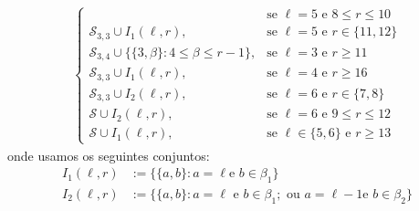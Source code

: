 \documentclass[12pt,a4paper]{book}
\begin{document}
\begin{equation*}
\begin{aligned}
\begin{cases}
        & \text{se } \ell=5 \text{ e } 8\leq r\leq 10    \\
         \mathcal{S}_{3,3} \cup I_1(\ell,r), 
        & \text{se } \ell=5 \text{ e } r\in \{11,12\}    \\
        \mathcal{S}_{3,4} \cup \{\{3,\beta\}: 4 \leq \beta \leq r-1\}, & \text{se } \ell =3 \text{ e } r \geq 11 \\
        \mathcal{S}_{3,3} \cup I_1(\ell,r),  & \text{se } \ell =4 \text{ e } r \geq 16  \\
         \mathcal{S}_{3,3} \cup I_2(\ell,r),  & \text{se } \ell=6 \text{ e } r \in\{7,8\}  \\
        \mathcal{S} \cup I_2(\ell,r),  & \text{se } \ell=6 \text{ e }  9\leq r \leq 12 \\
        \mathcal{S} \cup I_1(\ell,r),  & \text{se } \ell \in\{5,6\} \text{ e } r \geq 13         
        \end{cases}
    \end{aligned}  
\end{equation*}
onde usamos os seguintes conjuntos:
\begin{equation*}
    \begin{aligned}
        I_1(\ell,r) &:= \{\{a,b\}: a=\ell\text{
    e }b\in \beta_1\}
        \\
        I_2(\ell,r) &:= \{\{a,b\}: a=\ell\text{ e }b\in \beta_1;\text{ ou }a=\ell-1\text{
    e }b\in \beta_2\}
    \end{aligned}
\end{equation*}

\backmatter \singlespacing   %
\end{document}
